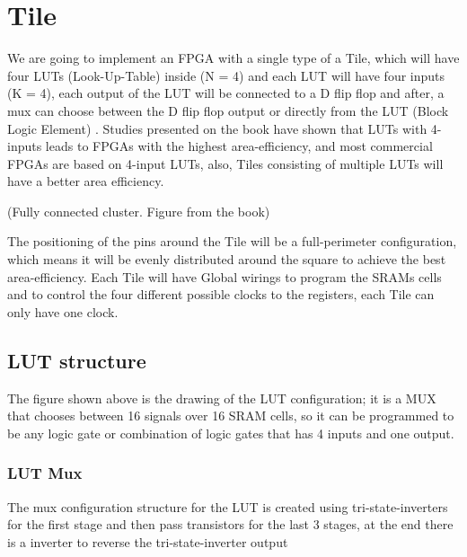 \documentclass[letterpaper,10pt,english]{sphinxmanual}
\begin{document}
\section{Tile}
\label{tile:tile}\label{tile::doc}
We  are going to implement an FPGA with a single type of a Tile, which will have four LUTs (Look-Up-Table) inside (N = 4) and each LUT will have four inputs (K = 4), each output of the LUT will be connected to a D flip flop and after, a mux can choose between the D flip flop output or directly from the LUT (Block Logic Element) . Studies presented on the book have shown that LUTs with 4-inputs leads to FPGAs with the highest area-efficiency, and most commercial FPGAs are based on 4-input LUTs, also, Tiles consisting of multiple LUTs will have a better area efficiency.

\noindent{}

(Fully connected cluster. Figure from the book)

\noindent{}

The positioning of the pins around the Tile will be a full-perimeter configuration, which means it will be evenly distributed around the square to achieve the best area-efficiency. Each Tile will have Global wirings to program the SRAMs cells and to control the four different possible clocks to the registers, each Tile can only have one clock.


\subsection{LUT structure}
\label{lut:lut-structure}\label{lut::doc}
\noindent{}

The figure shown above is the drawing of the LUT configuration; it is a MUX that chooses between 16 signals over 16 SRAM cells, so it can be programmed to be any logic gate or combination of logic gates that has 4 inputs and one output.


\subsubsection{LUT Mux}
\label{muxstruct:lut-mux}\label{muxstruct::doc}
The mux configuration structure for the LUT is created using tri-state-inverters for the first stage and then pass transistors for the last 3 stages, at the end there is a inverter to reverse the tri-state-inverter output

\noindent{}
\end{document}
